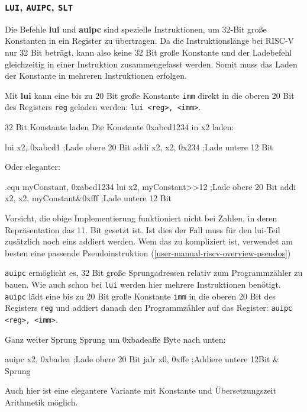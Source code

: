 \subsubsection{\texttt{LUI}, \texttt{AUIPC}, \texttt{SLT}}

Die Befehle \textbf{lui} und \textbf{auipc} sind spezielle Instruktionen, um
32-Bit große Konstanten in ein Register zu übertragen. Da die Instruktionslänge
bei RISC-V nur 32 Bit beträgt, kann also keine 32 Bit große Konstante und der
Ladebefehl gleichzeitig in einer Instruktion zusammengefasst werden. Somit muss
das Laden der Konstante in mehreren Instruktionen erfolgen.

Mit \textbf{lui} kann eine bis zu 20 Bit große Konstante \texttt{imm} direkt in die oberen 20 Bit des Registers \texttt{reg} geladen werden:
\texttt{lui <reg>, <imm>}.

\begin{exampleblock}{32 Bit Konstante laden}
Die Konstante 0xabcd1234 in x2 laden:\\
\begin{riscv}
  lui x2, 0xabcd1 	;Lade obere 20 Bit
  addi x2, x2, 0x234	;Lade untere 12 Bit
\end{riscv}
Oder eleganter:
\begin{riscv}
  .equ myConstant, 0xabcd1234
  lui x2, myConstant>>12        ;Lade obere 20 Bit
  addi x2, x2, myConstant&0xfff ;Lade untere 12 Bit
\end{riscv}

Vorsicht, die obige Implementierung funktioniert nicht bei Zahlen, in deren
Repräsentation das 11. Bit gesetzt ist. Ist dies der Fall muss für den lui-Teil
zusätzlich noch eins addiert werden. Wem das zu kompliziert ist, verwendet am
besten eine passende Pseudoinstruktion
(\autoref{user-manual-riscv-overview-pseudos})

\end{exampleblock}

\texttt{auipc} ermöglicht es, 32 Bit große Sprungadressen relativ zum
Programmzähler zu bauen. Wie auch schon bei \texttt{lui} werden hier mehrere
Instruktionen benötigt. \texttt{auipc} lädt eine bis zu 20 Bit große Konstante
\texttt{imm} in die oberen 20 Bit des Registers \texttt{reg} und addiert danach
den Programmzähler auf das Register: \texttt{auipc <reg>, <imm>}.

\begin{exampleblock}{Ganz weiter Sprung}
Sprung um 0xbadeaffe Byte nach unten:
\begin{riscv}
  auipc x2, 0xbadea	;Lade obere 20 Bit
  jalr x0, 0xffe	;Addiere untere 12Bit & Sprung
\end{riscv}
Auch hier ist eine elegantere Variante mit Konstante und Übersetzungszeit
Arithmetik möglich.
\end{exampleblock}

